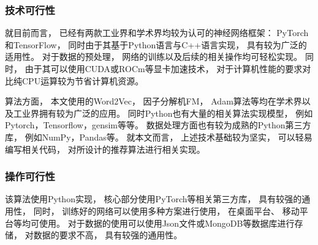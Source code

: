 \subsubsection{技术可行性}

就目前而言，
已经有两款工业界和学术界均较为认可的神经网络框架：
PyTorch和TensorFlow，
同时由于其基于Python语言与C++语言实现，
具有较为广泛的适用性。
对于数据的预处理，
网络的训练以及后续的相关操作均可轻松实现。
同时，
由于其可以使用CUDA或ROCm等显卡加速技术，
对于计算机性能的要求对比纯CPU运算较为节省计算机资源。

算法方面，
本文使用的Word2Vec，
因子分解机FM，
Adam算法等均在学术界以及工业界拥有较为广泛的应用。
同时Python也有大量的相关算法实现模型，
例如Pytorch，Tensorflow，gensim等等。
数据处理方面也有较为成熟的Python第三方库，
例如NumPy，Pandas等。
就本文而言，
上述技术基础较为坚实，
可以轻易编写相关代码，
对所设计的推荐算法进行相关实现。

\subsubsection{操作可行性}

该算法使用Python实现，
核心部分使用PyTorch等相关第三方库，
具有较强的通用性，
同时，
训练好的网络可以使用多种方案进行使用，
在桌面平台、
移动平台等均可使用。
对于数据的使用可以使用Json文件或MongoDB等数据库进行存储，
对数据的要求不高，
具有较强的通用性。